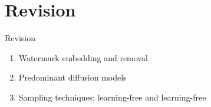\section{Revision}

\begin{frame}{Revision}
    \begin{enumerate}
        \item Watermark embedding and removal
        \item Predominant diffusion models
        \item Sampling techniques: learning-free and learning-free
    \end{enumerate}
\end{frame}
